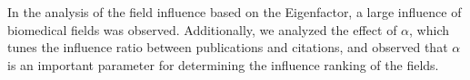%

In the analysis of the field influence based on the Eigenfactor, a large influence of biomedical fields was observed. Additionally, we analyzed the effect of $\alpha$, which tunes the influence ratio between publications and citations, and observed that $\alpha$ is an important parameter for determining the influence ranking of the fields.

%
